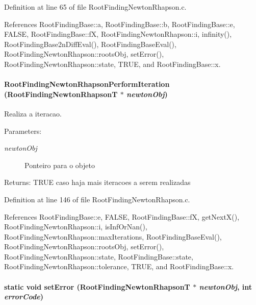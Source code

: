 Definition at line 65 of file RootFindingNewtonRhapson.c.

References RootFindingBase::a, RootFindingBase::b, RootFindingBase::e, FALSE, RootFindingBase::fX, RootFindingNewtonRhapson::i, infinity(), RootFindingBase2nDiffEval(), RootFindingBaseEval(), RootFindingNewtonRhapson::rootsObj, setError(), RootFindingNewtonRhapson::state, TRUE, and RootFindingBase::x.\hypertarget{group____newton_g730f69beaf24e0c2ecfa81a124a09987}{
\paragraph[RootFindingNewtonRhapsonPerformIteration]{ RootFindingNewtonRhapsonPerformIteration ({\bf RootFindingNewtonRhapsonT} $\ast$ {\em newtonObj})}\hfill}
\label{group____newton_g730f69beaf24e0c2ecfa81a124a09987}


Realiza a iteracao. 

\begin{Desc}
\item[Parameters:]
\begin{description}
\item[{\em newtonObj}]Ponteiro para o objeto \end{description}
\end{Desc}
\begin{Desc}
\item[Returns:]TRUE caso haja mais iteracoes a serem realizadas \end{Desc}


Definition at line 146 of file RootFindingNewtonRhapson.c.

References RootFindingBase::e, FALSE, RootFindingBase::fX, getNextX(), RootFindingNewtonRhapson::i, isInfOrNan(), RootFindingNewtonRhapson::maxIterations, RootFindingBaseEval(), RootFindingNewtonRhapson::rootsObj, setError(), RootFindingNewtonRhapson::state, RootFindingBase::state, RootFindingNewtonRhapson::tolerance, TRUE, and RootFindingBase::x.\hypertarget{group____newton_g5d327a5dbdddddf1f6f5a68e7089031b}{
\paragraph[setError]{\setlength{\rightskip}{0pt plus 5cm}static void setError ({\bf RootFindingNewtonRhapsonT} $\ast$ {\em newtonObj}, \/  int {\em errorCode})}\hfill}
\label{group____newton_g5d327a5dbdddddf1f6f5a68e7089031b}


